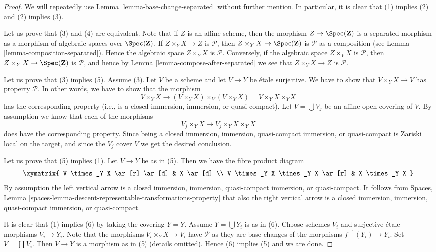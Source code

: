 \begin{proof}
We will repeatedly use
Lemma \ref{lemma-base-change-separated}
without further mention. In particular, it is clear that
(1) implies (2) and (2) implies (3).

\medskip\noindent
Let us prove that (3) and (4) are equivalent. Note that if $Z$ is an affine
scheme, then the morphism $Z \to \Spec(\mathbf{Z})$ is a separated
morphism as a morphism of algebraic spaces over $\Spec(\mathbf{Z})$.
If $Z \times_Y X \to Z$ is $\mathcal{P}$, then
$Z \times_Y X \to \Spec(\mathbf{Z})$ is $\mathcal{P}$
as a composition (see
Lemma \ref{lemma-composition-separated}). Hence the algebraic
space $Z \times_Y X$ is $\mathcal{P}$. Conversely, if the algebraic
space $Z \times_Y X$ is $\mathcal{P}$, then
$Z \times_Y X \to \Spec(\mathbf{Z})$ is $\mathcal{P}$, and
hence by
Lemma \ref{lemma-compose-after-separated}
we see that $Z \times_Y X \to Z$ is $\mathcal{P}$.

\medskip\noindent
Let us prove that (3) implies (5). Assume (3). Let $V$ be a scheme
and let $V \to Y$ be \'etale surjective. We have to show that
$V \times_Y X \to V$ has property $\mathcal{P}$. In other words,
we have to show that the morphism
$$
V \times_Y X \longrightarrow
(V \times_Y X) \times_V (V \times_Y X) = V \times_Y X \times_Y X
$$
has the corresponding property (i.e., is a closed immersion, immersion,
or quasi-compact). Let $V = \bigcup V_j$ be an
affine open covering of $V$. By assumption we know that each of the morphisms
$$
V_j \times_Y X \longrightarrow V_j \times_Y X \times_Y X
$$
does have the corresponding property. Since being a closed immersion,
immersion, quasi-compact immersion, or quasi-compact is Zariski local
on the target, and since the $V_j$ cover $V$ we get the desired conclusion.

\medskip\noindent
Let us prove that (5) implies (1). Let $V \to Y$ be as in (5).
Then we have the fibre product diagram
$$
\xymatrix{
V \times_Y X \ar[r] \ar[d] &
X \ar[d] \\
V \times_Y X \times_Y X \ar[r] &
X \times_Y X
}
$$
By assumption the left vertical arrow is a closed immersion,
immersion, quasi-compact immersion, or quasi-compact. It follows from
Spaces, Lemma \ref{spaces-lemma-descent-representable-transformations-property}
that also the right vertical arrow is a closed immersion,
immersion, quasi-compact immersion, or quasi-compact.

\medskip\noindent
It is clear that (1) implies (6) by taking the covering $Y = Y$.
Assume $Y = \bigcup Y_i$ is as in (6). Choose schemes $V_i$ and
surjective \'etale morphisms $V_i \to Y_i$. Note that the morphisms
$V_i \times_Y X \to V_i$ have $\mathcal{P}$ as they are base changes
of the morphisms $f^{-1}(Y_i) \to Y_i$. Set $V = \coprod V_i$.
Then $V \to Y$ is a morphism as in (5) (details omitted). Hence
(6) implies (5) and we are done.
\end{proof}


